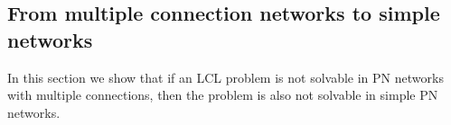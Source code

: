 %
%

\subsection{From multiple connection networks to simple networks} \label{sec:algorithm:from_multiple_to_simple}

In this section we show that if an LCL problem is not solvable in PN networks with multiple connections, then the problem is also not solvable in simple PN networks.


